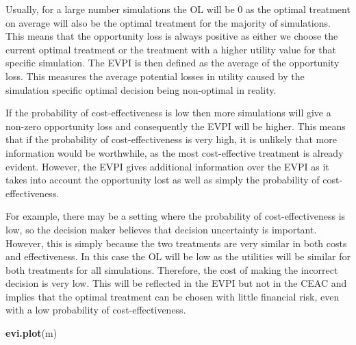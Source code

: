 \documentclass[]{article}
\newenvironment{Shaded}{\begin{snugshade}}{\end{snugshade}}
\newcommand{\KeywordTok}[1]{\textcolor[rgb]{0.13,0.29,0.53}{\textbf{#1}}}
\newcommand{\NormalTok}[1]{#1}
\begin{document}
Usually, for a large number simulations the OL will be 0 as the optimal
treatment on average will also be the optimal treatment for the majority
of simulations. This means that the opportunity loss is always positive
as either we choose the current optimal treatment or the treatment with
a higher utility value for that specific simulation. The EVPI is then
defined as the average of the opportunity loss. This measures the
average potential losses in utility caused by the simulation specific
optimal decision being non-optimal in reality.

If the probability of cost-effectiveness is low then more simulations
will give a non-zero opportunity loss and consequently the EVPI will be
higher. This means that if the probability of cost-effectiveness is very
high, it is unlikely that more information would be worthwhile, as the
most cost-effective treatment is already evident. However, the EVPI
gives additional information over the EVPI as it takes into account the
opportunity lost as well as simply the probability of
cost-effectiveness.

For example, there may be a setting where the probability of
cost-effectiveness is low, so the decision maker believes that decision
uncertainty is important. However, this is simply because the two
treatments are very similar in both costs and effectiveness. In this
case the OL will be low as the utilities will be similar for both
treatments for all simulations. Therefore, the cost of making the
incorrect decision is very low. This will be reflected in the EVPI but
not in the CEAC and implies that the optimal treatment can be chosen
with little financial risk, even with a low probability of
cost-effectiveness.

\begin{Shaded}
\begin{Highlighting}[]
\KeywordTok{evi.plot}\NormalTok{(m)}
\end{Highlighting}
\end{Shaded}
\end{document}
